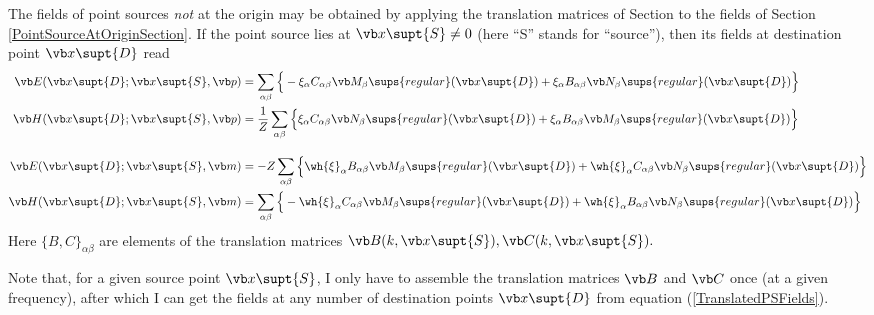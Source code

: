 \documentclass[letterpaper]{article}
\begin{document}
The fields of point sources \textit{not} at the
origin may be obtained by applying the translation matrices
of Section \label{TranslationMatrixSection}
to the fields of Section \ref{PointSourceAtOriginSection}.
If the point source lies at $\vb x\supt{S}\ne 0$ (here ``S''
stands for ``source''), then 
its fields at destination point $\vb x\supt{D}$
read
\begin{subequations}
\begin{align}
 \vb E(\vb x\supt{D}; \vb x\supt{S}, \vb p)
   &= \sum_{\alpha\beta}
      \Big\{
       -\xi_\alpha C_{\alpha\beta}  \vb M_\beta\sups{regular}(\vb x\supt{D})
       +\xi_\alpha B_{\alpha\beta} \vb N_\beta\sups{regular}(\vb x\supt{D})
      \Big\}
\\
 \vb H(\vb x\supt{D}; \vb x\supt{S}, \vb p)
   &= \frac{1}{Z}\sum_{\alpha\beta}
                    \Big\{
         \xi_\alpha C_{\alpha\beta} \vb N_\beta\sups{regular}(\vb x\supt{D})
       + \xi_\alpha B_{\alpha\beta} \vb M_\beta\sups{regular}(\vb x\supt{D})
                    \Big\}
\\[10pt]
 \vb E(\vb x\supt{D}; \vb x\supt{S}, \vb m)
   &=-Z \sum_{\alpha\beta} \Big\{
        \wh{\xi}_\alpha B_{\alpha\beta} \vb M_\beta\sups{regular}(\vb x\supt{D})
       +\wh{\xi}_\alpha C_{\alpha\beta} \vb N_\beta\sups{regular}(\vb x\supt{D})
                    \Big\}
\\
 \vb H(\vb x\supt{D}; \vb x\supt{S}, \vb m)
   &= \sum_{\alpha\beta} \Big\{
       -\wh{\xi}_\alpha C_{\alpha\beta} \vb M_\beta\sups{regular}(\vb x\supt{D})
       +\wh{\xi}_\alpha B_{\alpha\beta} \vb N_\beta\sups{regular}(\vb x\supt{D})
                    \Big\}
\end{align}
\label{TranslatedPSFields}
\end{subequations}
Here $\{B,C\}_{\alpha\beta}$ are elements of the translation matrices
$\vb B(k,\vb x\supt{S}), \vb C(k,\vb x\supt{S}).$

Note that, for a given source point $\vb x\supt{S}$, I only have
to assemble the translation matrices $\vb B$ and $\vb C$ once
(at a given frequency), after which I can get the fields
at any number of destination points $\vb x\supt{D}$ from
equation (\ref{TranslatedPSFields}).


\newpage
\end{document}
